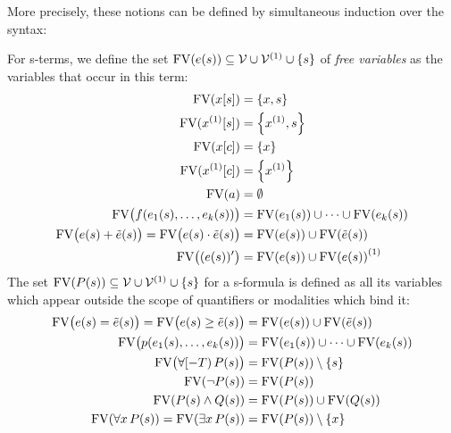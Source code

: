         More precisely, these notions can be defined by simultaneous induction over the syntax:
        \begin{definition}
            For s-terms, we define the set $\freevars{\astrm(s)}\subseteq\allvars\cup\diffvars\cup\set{s}$ of \emph{free variables} as the variables that occur in this term:
            \begin{align*}
                \freevars{\x[s]} &= \set{x,s}\\
                \freevars{\Dx[s]} &= \set{\D{x},s}\\
                \freevars{\x[c]} &= \set{x}\\
                \freevars{\Dx[c]} &= \set{\D{x}}\\
                \freevars{a} &= \emptyset\\
                \freevars[\big]{f(\range{\istrm{1}(s)}{\istrm{k}(s)})} &= \freevars{\istrm{1}(s)} \cup\cdots\cup \freevars{\istrm{k}(s)}\\
                \freevars[\big]{\astrm(s)+\bstrm(s)} = \freevars[\big]{\astrm(s)\cdot\bstrm(s)} &= \freevars{\astrm(s)}\cup\freevars{\bstrm(s)}\\
                \freevars[\big]{\der{\astrm(s)}} &= \freevars{\astrm(s)}\cup\D{\freevars{\astrm(s)}}
            \end{align*}
            The set $\freevars{\asfml(s)}\subseteq\allvars\cup\diffvars\cup\set{s}$ for a s-formula is defined as all its variables which appear outside the scope of quantifiers or modalities which bind it:
            \begin{align*}
                \freevars[\big]{\astrm(s)=\bstrm(s)} = \freevars[\big]{\astrm(s)\geq\bstrm(s)} &= \freevars{\astrm(s)}\cup\freevars{\bstrm(s)}\\
                \freevars[\big]{p(\range{\istrm{1}(s)}{\istrm{k}(s)})} &= \freevars{\istrm{1}(s)} \cup\cdots\cup \freevars{\istrm{k}(s)}\\
                \freevars[\big]{\hs{\asfml(s)}} &= \freevars{\asfml(s)}\setminus\set{s}\\
                \freevars{\lnot\asfml(s)} &= \freevars{\asfml(s)}\\
                \freevars{\asfml(s)\land\bsfml(s)} &= \freevars{\asfml(s)}\cup\freevars{\bsfml(s)}\\
                \freevars{\lforall{x}{\asfml(s)}} = \freevars{\lexists{x}{\asfml(s)}} &= \freevars{\asfml(s)}\setminus\set{x}\\

\end{align*}
\end{definition}
